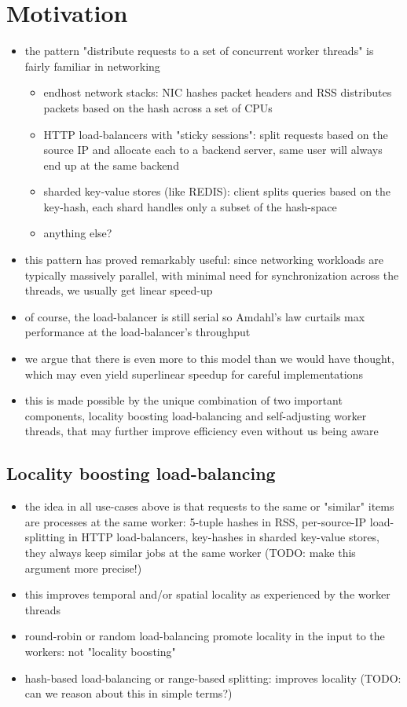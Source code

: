 \documentclass[11pt]{article}
\begin{document}
\section{Motivation}
\label{sec:orgeb571da}

\begin{itemize}
\item the pattern "distribute requests to a set of concurrent worker threads" is fairly familiar in
networking
\begin{itemize}
\item endhost network stacks: NIC hashes packet headers and RSS distributes packets based on the hash
across a set of CPUs
\item HTTP load-balancers with "sticky sessions": split requests based on the source IP and allocate
each to a backend server, same user will always end up at the same backend
\item sharded key-value stores (like REDIS): client splits queries based on the key-hash, each shard
handles only a subset of the hash-space
\item anything else?
\end{itemize}
\item this pattern has proved remarkably useful: since networking workloads are typically massively
parallel, with minimal need for synchronization across the threads, we usually get linear
speed-up
\item of course, the load-balancer is still serial so Amdahl's law curtails max performance at the
load-balancer's throughput
\item we argue that there is even more to this model than we would have thought, which may even yield
superlinear speedup for careful implementations
\item this is made possible by the unique combination of two important components, locality boosting
load-balancing and self-adjusting worker threads, that may further improve efficiency even
without us being aware
\end{itemize}

\subsection{Locality boosting load-balancing}
\label{sec:org8d49eee}
\begin{itemize}
\item the idea in all use-cases above is that requests to the same or "similar" items are processes at
the same worker: 5-tuple hashes in RSS, per-source-IP load-splitting in HTTP load-balancers,
key-hashes in sharded key-value stores, they always keep similar jobs at the same worker (TODO:
make this argument more precise!)
\item this improves temporal and/or spatial locality as experienced by the worker threads
\item round-robin or random load-balancing promote locality in the input to the workers: not "locality
boosting"
\item hash-based load-balancing or range-based splitting: improves locality (TODO: can we reason about
this in simple terms?)
\end{itemize}
\end{document}
